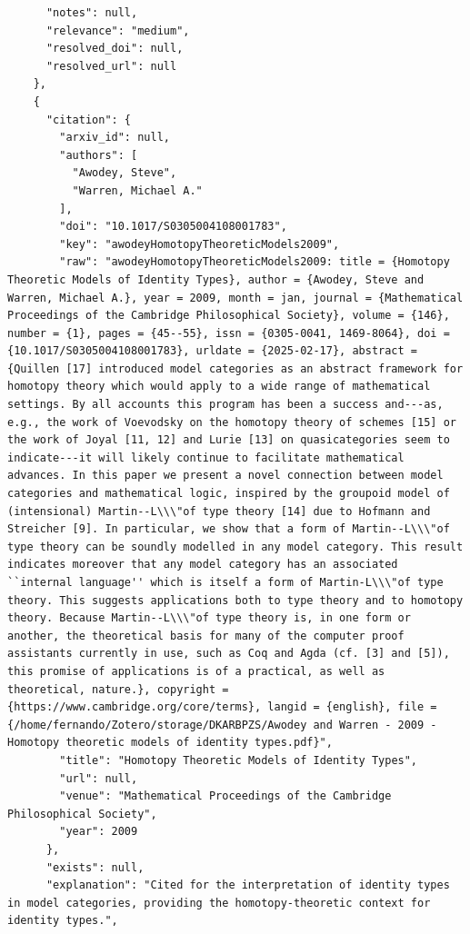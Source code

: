 \documentclass[11pt]{article}
\begin{document}
\begin{verbatim}
      "notes": null,
      "relevance": "medium",
      "resolved_doi": null,
      "resolved_url": null
    },
    {
      "citation": {
        "arxiv_id": null,
        "authors": [
          "Awodey, Steve",
          "Warren, Michael A."
        ],
        "doi": "10.1017/S0305004108001783",
        "key": "awodeyHomotopyTheoreticModels2009",
        "raw": "awodeyHomotopyTheoreticModels2009: title = {Homotopy Theoretic Models of Identity Types}, author = {Awodey, Steve and Warren, Michael A.}, year = 2009, month = jan, journal = {Mathematical Proceedings of the Cambridge Philosophical Society}, volume = {146}, number = {1}, pages = {45--55}, issn = {0305-0041, 1469-8064}, doi = {10.1017/S0305004108001783}, urldate = {2025-02-17}, abstract = {Quillen [17] introduced model categories as an abstract framework for homotopy theory which would apply to a wide range of mathematical settings. By all accounts this program has been a success and---as, e.g., the work of Voevodsky on the homotopy theory of schemes [15] or the work of Joyal [11, 12] and Lurie [13] on quasicategories seem to indicate---it will likely continue to facilitate mathematical advances. In this paper we present a novel connection between model categories and mathematical logic, inspired by the groupoid model of (intensional) Martin--L\\\"of type theory [14] due to Hofmann and Streicher [9]. In particular, we show that a form of Martin--L\\\"of type theory can be soundly modelled in any model category. This result indicates moreover that any model category has an associated ``internal language'' which is itself a form of Martin-L\\\"of type theory. This suggests applications both to type theory and to homotopy theory. Because Martin--L\\\"of type theory is, in one form or another, the theoretical basis for many of the computer proof assistants currently in use, such as Coq and Agda (cf. [3] and [5]), this promise of applications is of a practical, as well as theoretical, nature.}, copyright = {https://www.cambridge.org/core/terms}, langid = {english}, file = {/home/fernando/Zotero/storage/DKARBPZS/Awodey and Warren - 2009 - Homotopy theoretic models of identity types.pdf}",
        "title": "Homotopy Theoretic Models of Identity Types",
        "url": null,
        "venue": "Mathematical Proceedings of the Cambridge Philosophical Society",
        "year": 2009
      },
      "exists": null,
      "explanation": "Cited for the interpretation of identity types in model categories, providing the homotopy-theoretic context for identity types.",

\end{verbatim}
\end{document}
